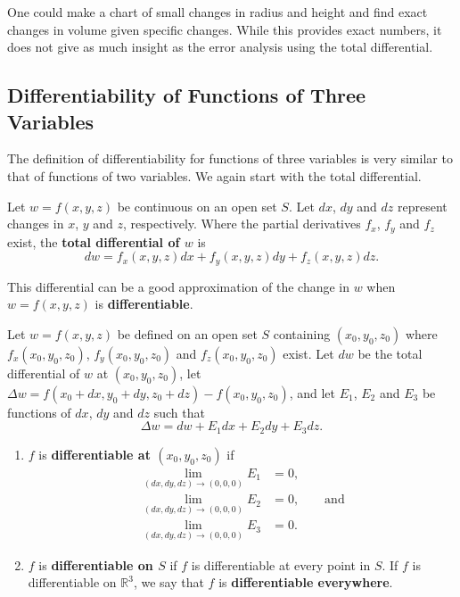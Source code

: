 One could make a chart of small changes in radius and height and find exact changes in volume given specific changes. While this provides exact numbers, it does not give as much insight as the error analysis using the total differential.

\subsection{Differentiability of Functions of Three Variables}

The definition of differentiability for functions of three variables is very similar to that of functions of two variables. We again start with the total differential.

{Let $w=f(x,y,z)$ be continuous on an open set $S$. Let $dx$, $dy$ and $dz$ represent changes in $x$, $y$ and  $z$, respectively. Where the partial derivatives $f_x$, $f_y$ and $f_z$ exist, the \textbf{total differential of $w$} is
\[dw = f_x(x,y,z)dx + f_y(x,y,z)dy+f_z(x,y,z)dz.\]
}

This differential can be a good approximation of the change in $w$ when $w = f(x,y,z)$ is \textbf{differentiable}.

{Let $w=f(x,y,z)$ be defined on an open set $S$ containing $(x_0,y_0,z_0)$ where $f_x(x_0,y_0,z_0)$, $f_y(x_0,y_0,z_0)$ and $f_z(x_0,y_0,z_0)$ exist. Let $dw$ be the total differential of $w$ at $(x_0,y_0,z_0)$, let $\Delta w = f(x_0+dx,y_0+dy,z_0+dz) - f(x_0,y_0,z_0)$, and let $E_1$, $E_2$ and $E_3$ be functions of $dx$, $dy$ and $dz$  such that
\[\Delta w = dw + E_1dx + E_2dy + E_3dz.\]
\begin{enumerate}
	\item $f$ is \textbf{differentiable at $(x_0,y_0,z_0)$} if%
	\begin{align*}
	 \lim_{(dx,dy,dz)\to(0,0,0)}E_1 &=0,\\
	 \lim_{(dx,dy,dz)\to(0,0,0)}E_2 &=0,\qquad\text{and}\\
	 \lim_{(dx,dy,dz)\to(0,0,0)}E_3 &=0.
	\end{align*}
	\item	$f$ is \textbf{differentiable on $S$} if $f$ is differentiable at every point in $S$. If $f$ is differentiable on $\mathbb{R}^3$, we say that $f$ is \textbf{differentiable everywhere}.
\end{enumerate}}

